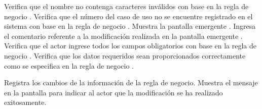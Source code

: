 \begin{UCtrayectoria}
    \UCpaso[\UCsist] Verifica que el nombre no contenga caracteres inválidos con base en la regla de negocio . 
    \UCpaso[\UCsist] Verifica que el número del caso de uso no se encuentre registrado en el sistema con base en la regla de negocio  . 
	\UCpaso[\UCsist] Muestra la pantalla emergente .
	\UCpaso[\UCactor] Ingresa el comentario referente a la modificación realizada en la pantalla emergente . \label{cu8.2:ingresaComentario}
	\UCpaso[\UCsist] Verifica que el actor ingrese todos los campos obligatorios con base en la regla de negocio  . 
	\UCpaso[\UCsist] Verifica que los datos requeridos sean proporcionados correctamente como se especifica en la regla de negocio . 
    
    
    \UCpaso[\UCsist] Registra los cambios de la información de la regla de negocio.
    \UCpaso[\UCsist] Muestra el mensaje  en la pantalla 
    para indicar al actor que la modificación se ha realizado exitosamente.
 \end{UCtrayectoria}
 

